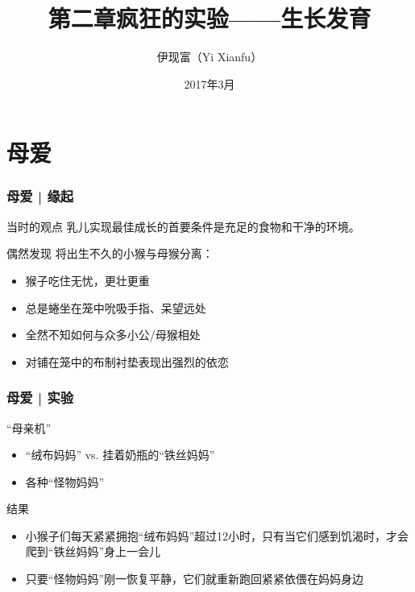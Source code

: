 



\title[生长发育]{第二章\quad 疯狂的实验——生长发育}
\author[Yixf]{伊现富（Yi Xianfu）}
\date{2017年3月}



\section{母爱}
\begin{frame}
  \frametitle{母爱 | 缘起}
  \begin{block}{当时的观点}
    乳儿实现最佳成长的首要条件是充足的食物和干净的环境。
  \end{block}
  \pause
  \begin{block}{偶然发现}
    将出生不久的小猴与母猴分离：
    \begin{itemize}
      \item 猴子吃住无忧，更壮更重
      \item 总是蜷坐在笼中吮吸手指、呆望远处
      \item 全然不知如何与众多小公/母猴相处
      \item 对铺在笼中的布制衬垫表现出强烈的依恋
    \end{itemize}
  \end{block}
\end{frame}

\begin{frame}
  \frametitle{母爱 | 实验}
  \begin{block}{“母亲机”}
    \begin{itemize}
      \item “绒布妈妈” vs. 挂着奶瓶的“铁丝妈妈”
      \item 各种“怪物妈妈”
    \end{itemize}
  \end{block}
  \pause
  \begin{block}{结果}
    \begin{itemize}
      \item 小猴子们每天紧紧拥抱“绒布妈妈”超过12小时，只有当它们感到饥渴时，才会爬到“铁丝妈妈”身上一会儿
      \item 只要“怪物妈妈”刚一恢复平静，它们就重新跑回紧紧依偎在妈妈身边
    \end{itemize}
  \end{block}
\end{frame}

